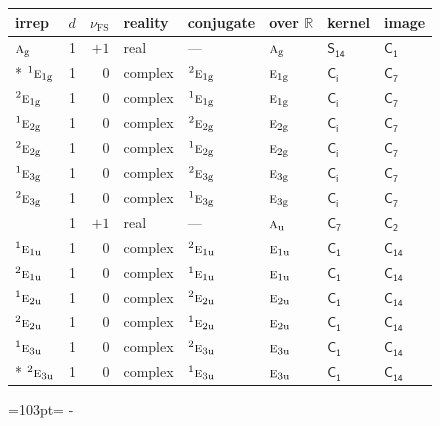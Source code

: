 \documentclass[10pt,a4paper]{article}
\newcommand{\needspace}[1]{\par\penalty-100\begingroup\dimen0=#1\relax\dimen2=\pagegoal
  \advance\dimen2-\pagetotal\ifdim\dimen0>\dimen2\relax\ifdim\dimen2>0pt\vfil\break\fi\fi
  \endgroup}
\numberwithin{equation}{section}
\newcommand{\grp}[1]{\mathsf{#1}}
\newcommand{\irr}[1]{\text{\normalfont\scshape #1}}
\newcommand{\conjpair}[1]{{}^{#1}}
\newcommand{\detbox}[1]{{\setlength{\fboxsep}{1pt}\fbox{#1}}}
\newcommand{\ptag}[1]{\mathrm{#1}}
\newcommand{\fsind}{\nu_{\mathrm{FS}}}
\begin{document}
{\small\renewcommand{\arraystretch}{1.25}\setlength{\tabcolsep}{4pt}\begin{longtable}{@{}lrrlllll@{}}\toprule
irrep & $d$ & $\fsind$ & reality & conjugate & over $\mathbb{R}$ & kernel & image\\\midrule\endhead
\bottomrule\endfoot\endlastfoot
$\irr{a}_{\ptag{g}}$ & 1 & $+1$ & real & --- & $\irr{a}_{\ptag{g}}$ & \href{S14.pdf}{$\grp{S_{14}}$} & \href{C1.pdf}{$\grp{C_{1}}$}\\*
$\conjpair{1}\irr{e}_{1\ptag{g}}$ & 1 & $0$ & complex & $\conjpair{2}\irr{e}_{1\ptag{g}}$ & $\irr{e}_{1\ptag{g}}$ & \href{S2.pdf}{$\grp{C_{i}}$} & \href{C7.pdf}{$\grp{C_{7}}$}\\
$\conjpair{2}\irr{e}_{1\ptag{g}}$ & 1 & $0$ & complex & $\conjpair{1}\irr{e}_{1\ptag{g}}$ & $\irr{e}_{1\ptag{g}}$ & \href{S2.pdf}{$\grp{C_{i}}$} & \href{C7.pdf}{$\grp{C_{7}}$}\\
$\conjpair{1}\irr{e}_{2\ptag{g}}$ & 1 & $0$ & complex & $\conjpair{2}\irr{e}_{2\ptag{g}}$ & $\irr{e}_{2\ptag{g}}$ & \href{S2.pdf}{$\grp{C_{i}}$} & \href{C7.pdf}{$\grp{C_{7}}$}\\
$\conjpair{2}\irr{e}_{2\ptag{g}}$ & 1 & $0$ & complex & $\conjpair{1}\irr{e}_{2\ptag{g}}$ & $\irr{e}_{2\ptag{g}}$ & \href{S2.pdf}{$\grp{C_{i}}$} & \href{C7.pdf}{$\grp{C_{7}}$}\\
$\conjpair{1}\irr{e}_{3\ptag{g}}$ & 1 & $0$ & complex & $\conjpair{2}\irr{e}_{3\ptag{g}}$ & $\irr{e}_{3\ptag{g}}$ & \href{S2.pdf}{$\grp{C_{i}}$} & \href{C7.pdf}{$\grp{C_{7}}$}\\
$\conjpair{2}\irr{e}_{3\ptag{g}}$ & 1 & $0$ & complex & $\conjpair{1}\irr{e}_{3\ptag{g}}$ & $\irr{e}_{3\ptag{g}}$ & \href{S2.pdf}{$\grp{C_{i}}$} & \href{C7.pdf}{$\grp{C_{7}}$}\\
\detbox{$\irr{a}_{\ptag{u}}$} & 1 & $+1$ & real & --- & $\irr{a}_{\ptag{u}}$ & \href{C7.pdf}{$\grp{C_{7}}$} & \href{C2.pdf}{$\grp{C_{2}}$}\\
$\conjpair{1}\irr{e}_{1\ptag{u}}$ & 1 & $0$ & complex & $\conjpair{2}\irr{e}_{1\ptag{u}}$ & $\irr{e}_{1\ptag{u}}$ & \href{C1.pdf}{$\grp{C_{1}}$} & $\grp{C_{14}}$\\
$\conjpair{2}\irr{e}_{1\ptag{u}}$ & 1 & $0$ & complex & $\conjpair{1}\irr{e}_{1\ptag{u}}$ & $\irr{e}_{1\ptag{u}}$ & \href{C1.pdf}{$\grp{C_{1}}$} & $\grp{C_{14}}$\\
$\conjpair{1}\irr{e}_{2\ptag{u}}$ & 1 & $0$ & complex & $\conjpair{2}\irr{e}_{2\ptag{u}}$ & $\irr{e}_{2\ptag{u}}$ & \href{C1.pdf}{$\grp{C_{1}}$} & $\grp{C_{14}}$\\
$\conjpair{2}\irr{e}_{2\ptag{u}}$ & 1 & $0$ & complex & $\conjpair{1}\irr{e}_{2\ptag{u}}$ & $\irr{e}_{2\ptag{u}}$ & \href{C1.pdf}{$\grp{C_{1}}$} & $\grp{C_{14}}$\\
$\conjpair{1}\irr{e}_{3\ptag{u}}$ & 1 & $0$ & complex & $\conjpair{2}\irr{e}_{3\ptag{u}}$ & $\irr{e}_{3\ptag{u}}$ & \href{C1.pdf}{$\grp{C_{1}}$} & $\grp{C_{14}}$\\*
$\conjpair{2}\irr{e}_{3\ptag{u}}$ & 1 & $0$ & complex & $\conjpair{1}\irr{e}_{3\ptag{u}}$ & $\irr{e}_{3\ptag{u}}$ & \href{C1.pdf}{$\grp{C_{1}}$} & $\grp{C_{14}}$\\
\bottomrule\end{longtable}}
\needspace{103pt}
\end{document}
